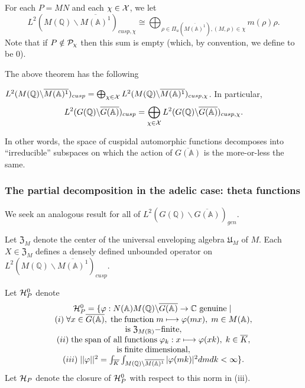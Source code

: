 For each $P=MN$ and each $\chi \in {\cal X}$, we let 
\begin{equation}
L^2(M({{\mathbb{Q}}})\backslash \overline{M({\mathbb{A}})^1})_{cusp,\chi }
\cong
\bigoplus_{\rho \in \Pi _u(\overline{M({\mathbb{A}})^1}) ,
(M,\rho )\in \chi }
m(\rho )\rho .
\end{equation}
Note that if $P\notin {\cal P}_\chi $ then this sum is empty (which, by
convention, we define to be $0$).

The above theorem has the following

\begin{corollary}
$L^2(M({\mathbb{Q}})\backslash \overline{M({\mathbb{A}})^1})_{cusp}
=\bigoplus_{\chi \in {\cal X}}
L^2(M({\mathbb{Q}})\backslash \overline{M({\mathbb{A}})^1})_{cusp,\chi }$.
In particular, 
\[
L^2(G({\mathbb{Q}})\backslash \overline{G({\mathbb{A}})})_{cusp}
=\bigoplus_{\chi \in {\cal X}}
L^2(G({\mathbb{Q}})\backslash \overline{G({\mathbb{A}})})_{cusp,\chi }.
\]
\end{corollary}

In other words, the space of cuspidal automorphic functions decomposes into
``irreducible'' subspaces on which the action of $\overline{G({\mathbb{A}})}$ is the
more-or-less the same.

\subsubsection{The partial decomposition in the adelic case: theta functions}

We seek an analogous result for all of
$L^2(G({\mathbb{Q}})\backslash \overline{G({\mathbb{A}})})_{gen}$.

Let ${\mathfrak{Z}}_M$ denote the center of the
universal enveloping algebra ${\mathfrak{U}}_M$ of $M$. Each
$X\in {\mathfrak{Z}}_M$ defines a densely defined
unbounded operator on
$L^2(M({\mathbb{Q}})\backslash \overline{M({\mathbb{A}})^1})_{cusp}$.

Let ${\cal H}_P^0$ denote 
\begin{equation}
\begin{array}{c}
{\cal H}_P^0
=\{\varphi :N({\mathbb{A}})M({\mathbb{Q}})
\backslash \overline{G({\mathbb{A}})}\rightarrow {\mathbb{C}}
\ {\rm genuine}\;|\; \\ 
(i)\;\forall x\in \overline{G({\mathbb{A}})},
\;{\rm the\;function}\;m\longmapsto \varphi (mx),
\;m\in M({\mathbb{A}}), \\ 
{\rm is}\;{\mathfrak{Z}}_{M({\mathbb{R}})}{\rm -finite}, \\ 
(ii)\;{\rm the\;span\;of\;all\;functions}
\;\varphi _k:x\longmapsto \varphi (xk),\;k\in \overline{K}, \\ 
{\rm is\;finite\;}{\rm dimensional}, \\ 
(iii)\;||\varphi ||^2=
\int_{\overline{K}}
\int_{M({\mathbb{Q}})\backslash \overline{M({\mathbb{A}})^1}}
|\varphi (mk)|^2dmdk<\infty \} .
\end{array}
\end{equation}
Let ${\cal H}_P$ denote the closure of ${\cal H}_P^0$ with respect to this
norm in (iii).


